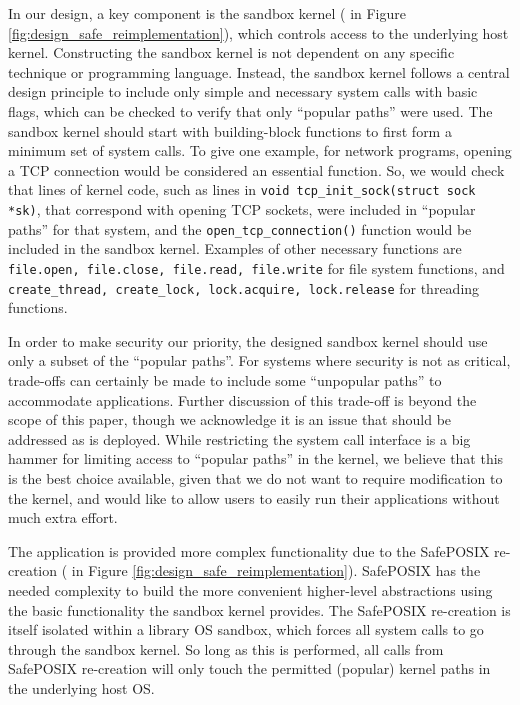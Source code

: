 In our \lip design, a key component is the sandbox kernel ( in Figure \ref{fig:design_safe_reimplementation}), 
which controls access to the underlying host kernel. 
Constructing the sandbox kernel is not dependent on any specific technique or programming language. 
Instead, the sandbox kernel follows a central design principle to include only simple and necessary system calls with basic flags, 
which can be checked to verify that only ``popular paths'' were used.  
The sandbox kernel should start with building-block functions to first form a minimum set of system calls. 
To give one example, for network programs, opening a TCP connection would be considered an essential function. 
So, we would check that lines of kernel code, such as lines in \texttt{void tcp\_init\_sock(struct sock *sk)}, that correspond 
with opening TCP sockets, were included in ``popular paths'' for that system, and the \texttt{open\_tcp\_connection()} function 
would be included in the sandbox kernel. 
Examples of other necessary functions are \texttt{file.open, file.close, file.read, file.write} for file system 
functions, and \texttt{create\_thread, create\_lock, lock.acquire, lock.release} for threading functions. 

In order to make security our priority, the designed sandbox kernel should use only a subset of the ``popular paths''. 
For systems where security is not as critical, trade-offs can certainly be made to include some ``unpopular paths'' to accommodate applications. 
Further discussion of this trade-off is beyond the scope of this paper, 
though we acknowledge it is an issue that should be addressed as \lip is deployed. 
While restricting the system call interface is a big hammer for limiting access to ``popular paths'' in the kernel, 
we believe that this is the best choice available, given that we do not want to require modification to the kernel, and 
would like to allow users to easily run their applications without much extra effort. 

The application is provided more complex functionality due to the SafePOSIX re-creation
( in Figure \ref{fig:design_safe_reimplementation}).
SafePOSIX has the needed complexity to build the more convenient higher-level
abstractions using the basic functionality the sandbox kernel provides.
The SafePOSIX re-creation is itself isolated within a library OS sandbox, which
forces all system calls to go through the sandbox kernel.
So long as this is performed, all calls from SafePOSIX re-creation will only touch the permitted (popular) kernel paths in the underlying host OS.

